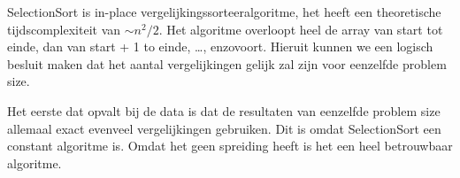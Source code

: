 SelectionSort is in-place vergelijkingssorteeralgoritme, het heeft een theoretische tijdscomplexiteit van \(\sim n^2/2\). Het algoritme overloopt heel de array van start tot einde, dan van start + 1 to einde, \ldots, enzovoort. Hieruit kunnen we een logisch besluit maken dat het aantal vergelijkingen gelijk zal zijn voor eenzelfde problem size.

Het eerste dat opvalt bij de data is dat de resultaten van eenzelfde problem size allemaal exact evenveel vergelijkingen gebruiken. Dit is omdat SelectionSort een constant algoritme is. Omdat het geen spreiding heeft is het een heel betrouwbaar algoritme.
